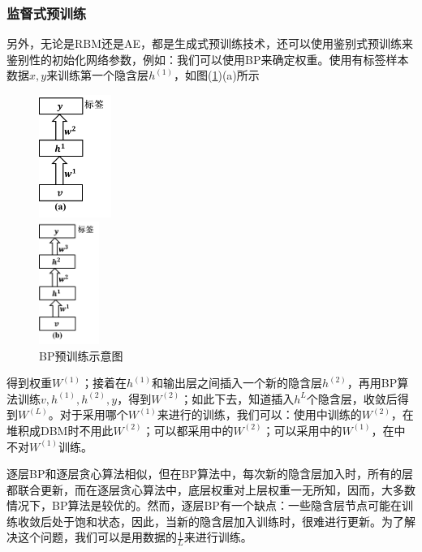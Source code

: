        \subsubsection{监督式预训练}
            \par
            另外，无论是RBM还是AE，都是生成式预训练技术，还可以使用鉴别式预训练来鉴别性的初始化网络参数，例如：我们可以使用BP来确定权重。使用有标签样本数据$x,y$来训练第一个隐含层$h^{(1)}$，如图(\ref{fig:BP预训练示意图})(a)所示
\begin{figure}[H]
  \centering
  \begin{varwidth}[t]{\textwidth}
    \vspace{0pt}
    \includegraphics[height=4cm]{images/BP_pretraining1.jpg}
  \end{varwidth}
  \qquad\qquad
  \begin{varwidth}[t]{\textwidth}
    \vspace{0pt}
    \includegraphics[height=4cm]{images/BP_pretraining2.jpg}
  \end{varwidth}
  \caption{BP预训练示意图}
  \label{fig:BP预训练示意图}
\end{figure}
            得到权重$W^{(1)}$；接着在$h^{(1)}$和输出层之间插入一个新的隐含层$h^{(2)}$，再用BP算法训练$v,h^{(1)},h^{(2)},y$，得到$W^{(2)}$；如此下去，知道插入$h^L$个隐含层，收敛后得到$W^{(L)}$。对于采用哪个$W^{(1)}$来进行的训练，我们可以：使用中训练的$W^{(2)}$，在堆积成DBM时不用此$W^{(2)}$；可以都采用中的$W^{(2)}$；可以采用中的$W^{(1)}$，在中不对$W^{(1)}$训练。
            \par
            逐层BP和逐层贪心算法相似，但在BP算法中，每次新的隐含层加入时，所有的层都联合更新，而在逐层贪心算法中，底层权重对上层权重一无所知，因而，大多数情况下，BP算法是较优的。然而，逐层BP有一个缺点：一些隐含层节点可能在训练收敛后处于饱和状态，因此，当新的隐含层加入训练时，很难进行更新。为了解决这个问题，我们可以是用数据的$\frac{1}{L}$来进行训练。
